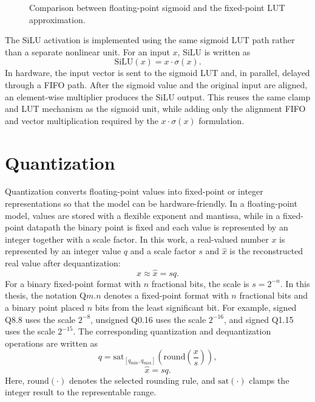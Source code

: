 \documentclass[11pt,twoside]{eitExjobb}
\begin{document}
\begin{figure}[H]
  \centering
  
  \caption{Comparison between floating-point sigmoid and the fixed-point LUT approximation.}
  \label{fig:sigmoid_lut_compare}
\end{figure}

The SiLU activation is implemented using the same sigmoid LUT path rather than a
separate nonlinear unit. For an input \(x\), SiLU is written as
\begin{equation}
\mathrm{SiLU}(x)=x\cdot\sigma(x).
\label{eq:silu_hw}
\end{equation}
In hardware, the input vector is sent to the sigmoid LUT and, in parallel, delayed
through a FIFO path. After the sigmoid value and the original input are aligned, an
element-wise multiplier produces the SiLU output. This reuses the same clamp and LUT
mechanism as the sigmoid unit, while adding only the alignment FIFO and vector
multiplication required by the \(x\cdot\sigma(x)\) formulation.

\section{Quantization}
Quantization converts floating-point values into fixed-point or integer
representations so that the model can be hardware-friendly. In a
floating-point model, values are stored with a flexible exponent and mantissa, while in
a fixed-point datapath the binary point is fixed and each value is represented by an
integer together with a scale factor. In this work, a real-valued number \(x\) is
represented by an integer value \(q\) and a scale factor \(s\) and \(\hat{x}\) is the reconstructed real value
after dequantization:
\begin{equation}
x \approx \hat{x} = s q .
\label{eq:fixed_point_basic}
\end{equation}
For a binary fixed-point format with \(n\) fractional bits, the scale is
\(s=2^{-n}\). In this thesis, the notation Q\(m.n\) denotes a fixed-point format
with \(n\) fractional bits and a binary point placed \(n\) bits from the least
significant bit. For example, signed Q8.8 uses the scale \(2^{-8}\), unsigned
Q0.16 uses the scale \(2^{-16}\), and signed Q1.15 uses the scale \(2^{-15}\).
The corresponding quantization and dequantization operations are written as
\begin{equation}
q = \mathrm{sat}_{[q_{\min},q_{\max}]}
\left(
\mathrm{round}\left(\frac{x}{s}\right)
\right),
\label{eq:quantize_basic}
\end{equation}
\begin{equation}
\hat{x}=s q .
\label{eq:dequantize_basic}
\end{equation}
Here, \(\mathrm{round}(\cdot)\) denotes the selected rounding rule, and
\(\mathrm{sat}(\cdot)\) clamps the integer result to the representable range.
\end{document}
